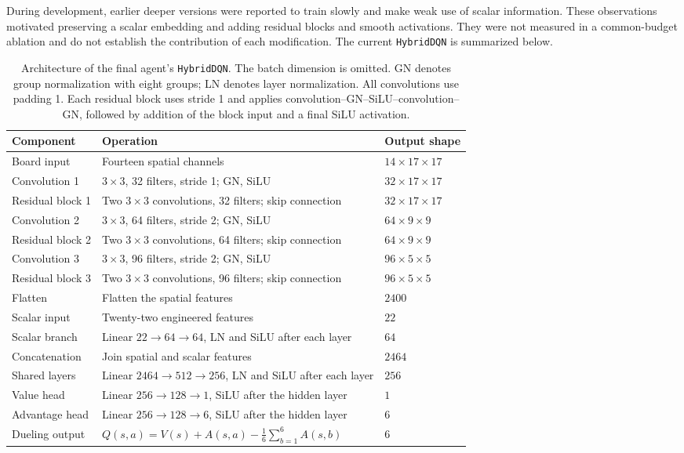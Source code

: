 \documentclass[11pt,a4paper]{article}
\begin{document}
During development, earlier deeper versions were reported to train slowly and make weak use of scalar information. These observations motivated preserving a scalar embedding and adding residual blocks and smooth activations. They were not measured in a common-budget ablation and do not establish the contribution of each modification. The current \texttt{HybridDQN} is summarized below.
\begin{table}[htbp]
\centering
\small
\begin{tabularx}{\textwidth}{@{}lYl@{}}
\toprule
Component & Operation & Output shape \\
\midrule
Board input & Fourteen spatial channels & $14\times17\times17$ \\
Convolution 1 & $3\times3$, 32 filters, stride 1; GN, SiLU & $32\times17\times17$ \\
Residual block 1 & Two $3\times3$ convolutions, 32 filters; skip connection & $32\times17\times17$ \\
Convolution 2 & $3\times3$, 64 filters, stride 2; GN, SiLU & $64\times9\times9$ \\
Residual block 2 & Two $3\times3$ convolutions, 64 filters; skip connection & $64\times9\times9$ \\
Convolution 3 & $3\times3$, 96 filters, stride 2; GN, SiLU & $96\times5\times5$ \\
Residual block 3 & Two $3\times3$ convolutions, 96 filters; skip connection & $96\times5\times5$ \\
Flatten & Flatten the spatial features & $2400$ \\
\midrule
Scalar input & Twenty-two engineered features & $22$ \\
Scalar branch & Linear $22\to64\to64$, LN and SiLU after each layer & $64$ \\
\midrule
Concatenation & Join spatial and scalar features & $2464$ \\
Shared layers & Linear $2464\to512\to256$, LN and SiLU after each layer & $256$ \\
Value head & Linear $256\to128\to1$, SiLU after the hidden layer & $1$ \\
Advantage head & Linear $256\to128\to6$, SiLU after the hidden layer & $6$ \\
Dueling output & $Q(s,a)=V(s)+A(s,a)-\frac{1}{6}\sum_{b=1}^{6}A(s,b)$ & $6$ \\
\bottomrule
\end{tabularx}
\caption{Architecture of the final agent's \texttt{HybridDQN}.
The batch dimension is omitted.
GN denotes group normalization with eight groups; LN denotes layer normalization.
All convolutions use padding 1.
Each residual block uses stride 1 and applies
convolution--GN--SiLU--convolution--GN, followed by addition of the
block input and a final SiLU activation.}
\label{tab:final-agent-network}
\end{table}
\end{document}
